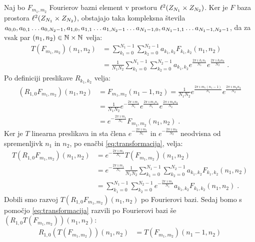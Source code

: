 \begin{dokaz}
Naj bo $F_{m_1, m_2}$ Fourierov bazni element v prostoru $\ell^2(Z_{N_1} \times Z_{N_2})$. Ker je $F$ baza prostora $\ell^2(Z_{N_1} \times Z_{N_2})$, obstajajo taka kompleksna števila $a_{0,0}, a_{0,1} \ldots a_{0,N_2-1}, a_{1,0}, \\ a_{1,1} \ldots a_{1,N_2-1} \ldots a_{N_1-1,0}, a_{N_1-1,1} \ldots a_{N_1-1,N_2-1}$, da za vsak par $(n_1, n_2) \in \mathbb N \times \mathbb N$ velja:
%
\begin{align}\label{eq:transformacija}
  T(F_{m_1, m_2})(n_1, n_2) & = \sum_{k_1=0}^{N_1-1} \sum_{k_2=0}^{N_2-1} a_{k_1, k_2} F_{k_1, k_2}(n_1, n_2) \\
 & = \frac{1}{N_1N_2} \sum_{k_1=0}^{N_1-1} \sum_{k_2=0}^{N_2-1} a_{k_1, k_2} e^{\frac{2\pi \imath k_1n_1}{N_1}} e^{\frac{2\pi \imath k_2n_2}{N_2}} \;.
\end{align}
%
Po definiciji preslikave $R_{k_1, k_2}$ velja:
%
\begin{align*}
(R_{1, 0} F_{m_1, m_2})(n_1, n_2) & = F_{m_1, m_2}(n_1-1, n_2) = \frac{1}{N_1N_2} e^{\frac{2\pi \imath m_1(n_1-1)}{N_1}} e^{\frac{2\pi \imath m_2n_2}{N_2}} \\
& = \frac{1}{N_1N_2} e^{-\frac{2\pi \imath m_1}{N_1}} e^{\frac{2\pi \imath m_1n_1}{N_1}} e^{\frac{2\pi \imath m_2n_2}{N_2}} \\
& =  e^{-\frac{2\pi \imath m_1}{N_1}} F_{m_1, m_2}(n_1, n_2) \;.
\end{align*}
%
Ker je $T$ linearna preslikava in sta člena $e^{-\frac{2\pi \imath m_1}{N_1}}$ in $e^{-\frac{2\pi \imath m_2}{N_2}}$ neodvisna od spremenljivk $n_1$ in $n_2$, po enačbi \eqref{eq:transformacija}, velja:
%
\begin{align*}
T(R_{1, 0} F_{m_1, m_2})(n_1, n_2) & = e^{-\frac{2\pi \imath m_1}{N_1}} T(F_{m_1, m_2})(n_1, n_2) \\
& = e^{-\frac{2\pi \imath m_1}{N_1}} \frac{1}{N_1N_2} \sum_{k_1=0}^{N_1-1} \sum_{k_2=0}^{N_2-1} a_{k_1, k_2} F_{k_1, k_2}(n_1, n_2) \\
& =  \sum_{k_1=0}^{N_1-1} \sum_{k_2=0}^{N_2-1} e^{-\frac{2\pi \imath m_1}{N_1}} a_{k_1, k_2} F_{k_1, k_2}(n_1, n_2) \;.
\end{align*}
%
Dobili smo razvoj $T(R_{1, 0} F_{m_1, m_2})(n_1, n_2)$ po Fourierovi bazi. Sedaj bomo s pomočjo \eqref{eq:transformacija} razvili po Fourierovi bazi še $(R_{1, 0} T(F_{m_1, m_2}))(n_1, n_2)$:
%
\begin{align*}
R_{1, 0} (T(F_{m_1, m_2}))(n_1, n_2) & = T(F_{m_1, m_2})(n_1-1, n_2) \\

\end{align*}
\end{dokaz}
